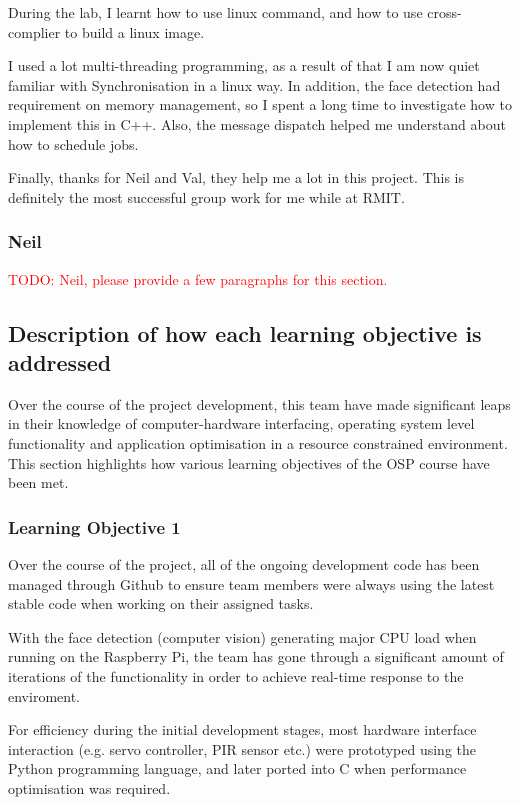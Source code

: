 \documentclass[11pt,a4paper,titlepage]{report}
\begin{document}
During the lab, I learnt how to use linux command, and how to use cross-complier to build a linux image.

I used a lot multi-threading programming, as a result of that I am now quiet familiar with Synchronisation in a linux way. In addition, the face detection had requirement on memory management, so I spent a long time to investigate how to implement this in C++. Also, the message dispatch helped me understand about how to schedule jobs.

Finally, thanks for Neil and Val, they help me a lot in this project. This is definitely the most successful group work for me while at RMIT.


\subsubsection{Neil}

\textcolor{red}{TODO: Neil, please provide a few paragraphs for this section.}





\subsection{Description of how each learning objective is addressed}


Over the course of the project development, this team have made significant leaps in their knowledge of computer-hardware interfacing, operating system level functionality and application optimisation in a resource constrained environment. This section highlights how various learning objectives of the OSP course have been met.
 
\subsubsection{Learning Objective 1}
Over the course of the project, all of the ongoing development code has been managed through Github to ensure team members were always using the latest stable code when working on their assigned tasks.

With the face detection (computer vision) generating major CPU load when running on the Raspberry Pi, the team has gone through a significant amount of iterations of the functionality in order to achieve real-time response to the enviroment.


For efficiency during the initial development stages, most hardware interface interaction (e.g. servo controller, PIR sensor etc.) were prototyped using the Python programming language, and later ported into C when performance optimisation was required.
\end{document}
